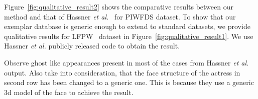 Figure~\ref{fig:qualitative_result2} shows the comparative results between our method and that
of Hassner {\em et al.}~\cite{DBLP:journals/corr/HassnerHPE14} for PIWFDS dataset. To show that our exemplar database is generic enough to extend to standard datasets, we provide qualitative results for LFPW~\cite{fiducials_cvpr2011} dataset in Figure~\ref{fig:qualitative_result1}. We use Hassner {\em et al.} publicly released code
to obtain the result. 

Observe ghost like appearances present in most of
the cases from Hassner {\em et al.}~\cite{DBLP:journals/corr/HassnerHPE14} output. Also take into consideration, that the face
structure of the actress in second row has been changed to a generic one. This is because they use a
generic {\sc 3d} model of the face to achieve the result.
